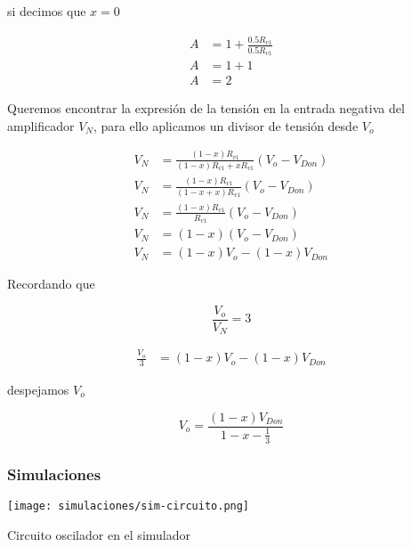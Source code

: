 si decimos que $x=0$ 

\begin{align*}
    A &= 1 + \frac{0.5 R_{v1}}{0.5 R_{v1}} \\
    A &= 1 + 1 \\
    A &= 2
\end{align*}

Queremos encontrar la expresión de la tensión en la entrada negativa del amplificador $V_N$, para ello aplicamos un divisor de tensión desde $V_o$

\begin{align*}
    V_N &= \frac{(1-x)R_{v1}}{(1-x)R_{v1} + x R_{v1}}(V_o - V_{Don}) \\
    V_N &= \frac{(1-x)R_{v1}}{(1-x +x)R_{v1}}(V_o - V_{Don})\\
    V_N &= \frac{(1-x)R_{v1}}{R_{v1}}(V_o - V_{Don}) \\
    V_N &= (1-x)(V_o - V_{Don}) \\
    V_N &= (1-x)V_o - (1-x)V_{Don} 
\end{align*}

Recordando que 

\begin{equation}
    \frac{V_o}{V_N} = 3
\end{equation}

\begin{align*}
    \frac{V_o}{3} &= (1-x)V_o - (1-x)V_{Don} 
\end{align*}

despejamos $V_o$

\begin{equation}
    V_o = \frac{(1-x)V_{Don}}{1-x - \frac{1}{3}}
\end{equation}

\paragraph{}

\FloatBarrier
\subsubsection{Simulaciones}

\begin{ilustracion}[hb]
    \centering
    \texttt{[image: simulaciones/sim-circuito.png]}
    \caption{Circuito oscilador en el simulador}
    \label{ilus:simulacion-circuito}
\end{ilustracion}

